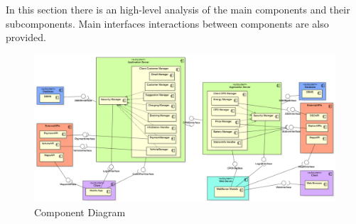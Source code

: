 In this section there is an high-level analysis of the main components and their subcomponents. Main interfaces interactions between components are also provided.


\begin{figure}[H]
    \begin{center}
        \includegraphics[width=\textwidth]{img/ComponentDiagram.PNG}
        \caption{Component Diagram}\label{component_diagram}
    \end{center}
\end{figure}





